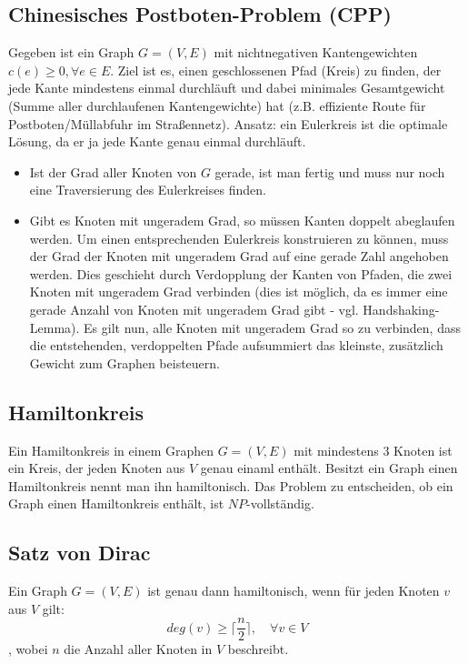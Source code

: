 \documentclass[10pt,a4paper,landscape]{article}
\begin{document}
\begin{multicols*}{2}
    \subsection{ Chinesisches Postboten-Problem (CPP) }
    Gegeben ist ein Graph $G = (V,E)$ mit nichtnegativen Kantengewichten $c(e) \geq 0, \forall e \in E$. Ziel ist es, einen geschlossenen Pfad (Kreis) zu finden, 
    der jede Kante mindestens einmal durchläuft und dabei minimales Gesamtgewicht (Summe aller durchlaufenen Kantengewichte) hat (z.B. effiziente Route für 
    Postboten/Müllabfuhr im Straßennetz).
    \newline
    Ansatz: ein Eulerkreis ist die optimale Lösung, da er ja jede Kante genau einmal durchläuft.
    \begin{itemize}
        \item Ist der Grad aller Knoten von $G$ gerade, ist man fertig und muss nur noch eine Traversierung des Eulerkreises finden.
        \item Gibt es Knoten mit ungeradem Grad, so müssen Kanten doppelt abeglaufen werden. Um einen entsprechenden Eulerkreis konstruieren zu können, 
        muss der Grad der Knoten mit ungeradem Grad auf eine gerade Zahl angehoben werden. Dies geschieht durch Verdopplung der Kanten von Pfaden, die zwei Knoten mit 
        ungeradem Grad verbinden (dies ist möglich, da es immer eine gerade Anzahl von Knoten mit ungeradem Grad gibt - vgl. Handshaking-Lemma). Es gilt nun, alle 
        Knoten mit ungeradem Grad so zu verbinden, dass die entstehenden, verdoppelten Pfade aufsummiert das kleinste, zusätzlich Gewicht zum Graphen beisteuern.
    \end{itemize}

    \subsection*{ Hamiltonkreis }
    Ein Hamiltonkreis in einem Graphen $G = (V,E)$ mit mindestens 3 Knoten ist ein Kreis, der jeden Knoten aus $V$ genau einaml enthält. Besitzt ein Graph einen Hamiltonkreis nennt man ihn 
    hamiltonisch. Das Problem zu entscheiden, ob ein Graph einen Hamiltonkreis enthält, ist $NP$-vollständig.

    \subsection*{ Satz von Dirac }
    Ein Graph $G = (V,E)$ ist genau dann hamiltonisch, wenn für jeden Knoten $v$ aus $V$ gilt:
    \[ deg(v) \geq \lceil\frac{n}{2}\rceil, \quad \forall v \in V \]
    , wobei $n$ die Anzahl aller Knoten in $V$ beschreibt.


\end{multicols*}
\end{document}
